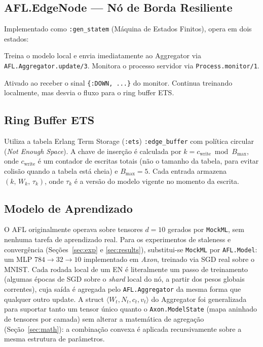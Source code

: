 \documentclass[conference,a4paper]{IEEEtran}
\begin{document}
\subsection{AFL.EdgeNode --- Nó de Borda Resiliente}

Implementado como \texttt{:gen\_statem} (Máquina de Estados Finitos), opera
em dois estados:

\begin{description}[leftmargin=*,noitemsep]
  \item[\textbf{:connected}] Treina o modelo local e envia imediatamente ao
    Aggregator via \texttt{AFL.Aggregator.update/3}. Monitora o processo
    servidor via \texttt{Process.monitor/1}.
  \item[\textbf{:disconnected}] Ativado ao receber o sinal \texttt{\{:DOWN,
    ...\}} do monitor. Continua treinando localmente, mas desvia o fluxo
    para o ring buffer ETS.
\end{description}

\subsection{Ring Buffer ETS}

Utiliza a tabela Erlang Term Storage (\texttt{:ets}) \texttt{:edge\_buffer}
com política circular (\textit{Not Enough Space}). A chave de inserção é
calculada por $k = c_{\text{write}} \bmod B_{\max}$, onde $c_{\text{write}}$
é um contador de escritas totais (não o tamanho da tabela, para evitar
colisão quando a tabela está cheia) e $B_{\max} = 5$. Cada entrada armazena
$(k,\, W_k,\, \tau_k)$, onde $\tau_k$ é a versão do modelo vigente no
momento da escrita.

\subsection{Modelo de Aprendizado}

O AFL originalmente operava sobre tensores $d=10$ gerados por
\texttt{MockML}, sem nenhuma tarefa de aprendizado real. Para os experimentos
de staleness e convergência (Seções~\ref{sec:exp} e \ref{sec:results}),
substitui-se \texttt{MockML} por \texttt{AFL.Model}: um MLP
$784\!\to\!32\!\to\!10$ implementado em \textit{Axon}, treinado via SGD real
sobre o MNIST. Cada rodada local de um EN é literalmente um passo de
treinamento (algumas épocas de SGD sobre o \textit{shard} local do nó, a
partir dos pesos globais correntes), cuja saída é agregada pelo
\texttt{AFL.Aggregator} da mesma forma que qualquer outro update. A struct
$\langle W_t, N_t, c_t, v_t \rangle$ do Aggregator foi generalizada para
suportar tanto um tensor único quanto o \texttt{Axon.ModelState} (mapa
aninhado de tensores por camada) sem alterar a matemática de agregação
(Seção~\ref{sec:math}): a combinação convexa é aplicada recursivamente sobre
a mesma estrutura de parâmetros.
\end{document}
